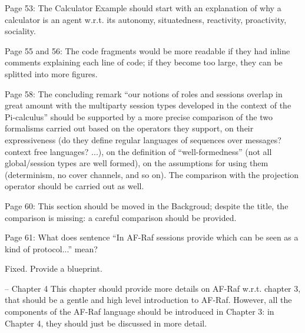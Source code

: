 \documentclass{article}
\newcommand{\todo}[1]{[\textcolor{red}{TODO}: #1]}
\newenvironment{them}{\noindent\begingroup\color{blue}}{\endgroup\par}
\begin{document}
\begin{them}

Page 53:
The Calculator Example should start with an explanation of why a calculator is an agent w.r.t. its autonomy, situatedness, reactivity, proactivity, sociality.
\end{them}
\todo{}

\begin{them}

Page 55 and 56:
The code fragments would be more readable if they had inline comments explaining each line of
code; if they become too large, they can be splitted into more figures.
\end{them}
\todo{}

\begin{them}

Page 58:
The concluding remark “our notions of roles and sessions overlap in great amount with the
multiparty session types developed in the context of the Pi-calculus” should be supported by a more
precise comparison of the two formalisms carried out based on the operators they support, on their
expressiveness (do they define regular languages of sequences over messages? context free
languages? ...), on the definition of “well-formedness” (not all global/session types are well formed),
on the assumptions for using them (determinism, no cover channels, and so on). The comparison
with the projection operator should be carried out as well.
\end{them}
\todo{}

\begin{them}

Page 60:
This section should be moved in the Backgroud; despite the title, the comparison is missing: a careful
comparison should be provided.
\end{them}
\todo{}

\begin{them}

Page 61:
What does sentence “In AF-Raf sessions provide which can be seen as a kind of protocol...” mean?
\end{them}
Fixed. Provide a blueprint.

\begin{them}

-- Chapter 4
This chapter should provide more details on AF-Raf w.r.t. chapter 3, that should be a gentle and high
level introduction to AF-Raf. However, all the components of the AF-Raf language should be
introduced in Chapter 3: in Chapter 4, they should just be discussed in more detail.
\end{them}
\todo{}
\end{document}
